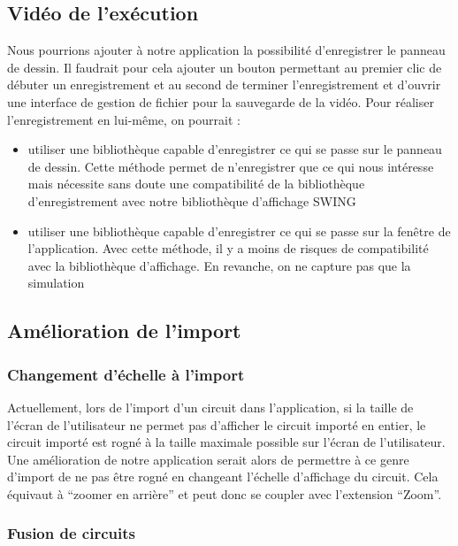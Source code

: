 \documentclass{report}
\begin{document}
\subsection{Vidéo de l'exécution}

Nous pourrions ajouter à notre application la possibilité d’enregistrer le panneau de dessin. Il faudrait pour cela ajouter un bouton permettant au premier clic de débuter un enregistrement et au second de terminer l’enregistrement et d’ouvrir une interface de gestion de fichier pour la sauvegarde de la vidéo.
Pour réaliser l’enregistrement en lui-même, on pourrait :
\begin{itemize}
\item utiliser une bibliothèque capable d’enregistrer ce qui se passe sur le panneau de dessin. Cette méthode permet de n’enregistrer que ce qui nous intéresse mais nécessite sans doute une compatibilité de la bibliothèque d’enregistrement avec notre bibliothèque d’affichage SWING
\item utiliser une bibliothèque capable d’enregistrer ce qui se passe sur la fenêtre de l’application. Avec cette méthode, il y a moins de risques de compatibilité avec la bibliothèque d’affichage. En revanche, on ne capture pas que la simulation
\end{itemize}




\subsection{Amélioration de l'import}

\subsubsection{Changement d'échelle à l'import}

Actuellement, lors de l’import d’un circuit dans l’application, si la taille de l’écran de l’utilisateur ne permet  pas d’afficher le circuit importé en entier, le circuit importé est rogné à la taille maximale possible sur l’écran de l’utilisateur. Une amélioration de notre application serait alors de permettre à ce genre d’import de ne pas être rogné en changeant l’échelle d’affichage du circuit. Cela équivaut à “zoomer en arrière” et peut donc se coupler avec l’extension “Zoom”.

\newpage
\subsubsection{Fusion de circuits}
\end{document}
